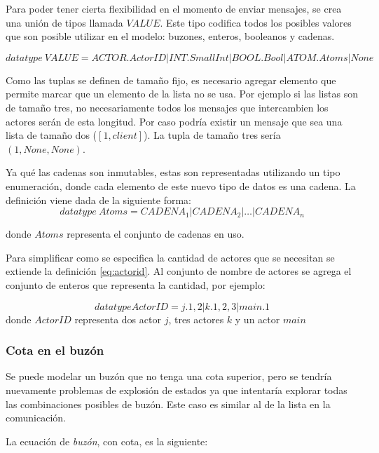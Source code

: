 Para poder tener cierta flexibilidad en el momento de enviar mensajes, se crea una unión de tipos llamada $VALUE$. Este tipo codifica todos los posibles valores que son posible utilizar en el modelo: buzones, enteros, booleanos y cadenas. 

\[
  datatype\ VALUE = ACTOR.ActorID | INT.SmallInt | BOOL.Bool | ATOM.Atoms | None
\]

Como las tuplas se definen de tamaño fijo, es necesario agregar elemento que permite marcar que un elemento de la lista no se usa. Por ejemplo si las listas son de tamaño tres, no necesariamente todos los mensajes que intercambien los actores serán de esta longitud. Por caso podría existir un mensaje que sea una lista de tamaño dos ($[1, client]$). La tupla de tamaño tres sería $(1, None, None)$. 

Ya qué las cadenas son inmutables, estas son representadas utilizando un tipo enumeración, donde cada elemento de este nuevo tipo de datos es una cadena. La definición viene dada de la siguiente forma:
\[
  datatype\ Atoms = CADENA_1 | CADENA_2 | \ldots | CADENA_n
\]

donde $Atoms$ representa el conjunto de cadenas en uso.

Para simplificar como se especifica la cantidad de actores que se necesitan se extiende la definición \ref{eq:actorid}. Al conjunto de nombre de actores se agrega el conjunto de enteros que representa la cantidad, por ejemplo:

\[
  datatype ActorID = j.{1,2} | k.{1,2,3} | main.{1}
\]
donde $ActorID$ representa dos actor $j$, tres actores $k$ y un actor $main$

\subsubsection*{Cota en el buzón}

Se puede modelar un buzón que no tenga una cota superior, pero se tendría nuevamente problemas de explosión de estados ya que \FDR intentaría explorar todas las combinaciones posibles de buzón. Este caso es similar al de la lista en la comunicación. 

La ecuación de \textit{buzón}, con cota, es la siguiente:

